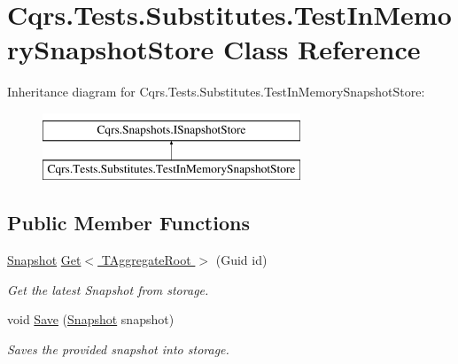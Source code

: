 \hypertarget{classCqrs_1_1Tests_1_1Substitutes_1_1TestInMemorySnapshotStore}{}\section{Cqrs.\+Tests.\+Substitutes.\+Test\+In\+Memory\+Snapshot\+Store Class Reference}
\label{classCqrs_1_1Tests_1_1Substitutes_1_1TestInMemorySnapshotStore}
Inheritance diagram for Cqrs.\+Tests.\+Substitutes.\+Test\+In\+Memory\+Snapshot\+Store\+:\begin{figure}[H]
\begin{center}
\leavevmode
\includegraphics[height=2.000000cm]{classCqrs_1_1Tests_1_1Substitutes_1_1TestInMemorySnapshotStore}
\end{center}
\end{figure}
\subsection*{Public Member Functions}
\begin{DoxyCompactItemize}
\item 
\hyperlink{classCqrs_1_1Snapshots_1_1Snapshot}{Snapshot} \hyperlink{classCqrs_1_1Tests_1_1Substitutes_1_1TestInMemorySnapshotStore_a8600a3211dd09e9fe2e2292a031f0d47_a8600a3211dd09e9fe2e2292a031f0d47}{Get$<$ T\+Aggregate\+Root $>$} (Guid id)
\begin{DoxyCompactList}\small\item\em Get the latest Snapshot from storage. \end{DoxyCompactList}\item 
void \hyperlink{classCqrs_1_1Tests_1_1Substitutes_1_1TestInMemorySnapshotStore_afec5ba3ed2b39625b3ccfb002d1c935e_afec5ba3ed2b39625b3ccfb002d1c935e}{Save} (\hyperlink{classCqrs_1_1Snapshots_1_1Snapshot}{Snapshot} snapshot)
\begin{DoxyCompactList}\small\item\em Saves the provided {\itshape snapshot}  into storage. \end{DoxyCompactList}\end{DoxyCompactItemize}
